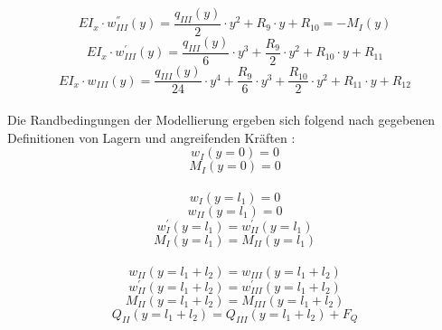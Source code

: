 \begin{equation}\label{eq:19}
	EI_{x}\cdot w_{III}^{''}(y) = \frac{q_{III}(y)}{2}\cdot y^{2} + R_{9}\cdot y + R_{10} = -M_{I}(y)
\end{equation}
\begin{equation}\label{eq:20}
	EI_{x}\cdot w_{III}^{'}(y) = \frac{q_{III}(y)}{6}\cdot y^{3} + \frac{R_{9}}{2}\cdot y^{2} + R_{10}\cdot y + R_{11} 
\end{equation}
\begin{equation}\label{eq:21}
	EI_{x}\cdot w_{III}(y) = \frac{q_{III}(y)}{24}\cdot y^{4} + \frac{R_{9}}{6}\cdot y^{3} + \frac{R_{10}}{2}\cdot y^{2} + R_{11}\cdot y + R_{12}
\end{equation}\\

\noindent Die Randbedingungen der Modellierung ergeben sich folgend nach gegebenen Definitionen von Lagern und angreifenden Kräften \cite{item16}: 
\begin{equation}\label{eq:22}
	w_{I}(y=0)=0
\end{equation}
\begin{equation}\label{eq:23}
	M_{I}(y=0)=0
\end{equation}\\
\begin{equation}\label{eq:24}
	w_{I}(y=l_{1}) = 0
\end{equation}
\begin{equation}\label{eq:25}
	w_{II}(y=l_{1}) = 0
\end{equation}
\begin{equation}\label{eq:26}
	w_{I}^{'}(y=l_{1}) = w_{II}^{'}(y=l_{1})
\end{equation}
\begin{equation}\label{eq:27}
	M_{I}(y=l_{1}) = M_{II}(y=l_{1})
\end{equation}\\
\begin{equation}\label{eq:28}
	w_{II}(y=l_{1}+l_{2}) = w_{III}(y=l_{1}+l_{2})
\end{equation}
\begin{equation}\label{eq:29}
	w_{II}^{'}(y=l_{1}+l_{2}) = w_{III}^{'}(y=l_{1}+l_{2})
\end{equation}
\begin{equation}\label{eq:30}
	M_{II}(y=l_{1}+l_{2}) = M_{III}(y=l_{1}+l_{2})
\end{equation}
\begin{equation}\label{eq:31}
	Q_{II}(y=l_{1}+l_{2}) = Q_{III}(y=l_{1}+l_{2})+F_{Q}
\end{equation}\\
